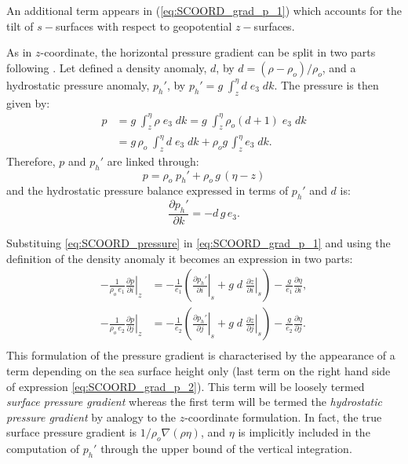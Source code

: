 \documentclass[../main/NEMO_manual]{subfiles}
\begin{document}
An additional term appears in (\autoref{eq:SCOORD_grad_p_1}) which accounts for
the tilt of $s-$surfaces with respect to geopotential $z-$surfaces.

As in $z$-coordinate,
the horizontal pressure gradient can be split in two parts following \citet{marsaleix.auclair.ea_OM08}.
Let defined a density anomaly, $d$, by $d=(\rho - \rho_o)/ \rho_o$,
and a hydrostatic pressure anomaly, $p_h'$, by $p_h'= g \; \int_z^\eta d \; e_3 \; dk$.
The pressure is then given by:
\[
  \begin{split}
    p &= g\; \int_z^\eta \rho \; e_3 \; dk = g\; \int_z^\eta \rho_o \left( d + 1 \right) \; e_3 \; dk   \\
    &= g \, \rho_o \; \int_z^\eta d \; e_3 \; dk + \rho_o g \, \int_z^\eta e_3 \; dk .
  \end{split}
\]
Therefore, $p$ and $p_h'$ are linked through:
\begin{equation}
  \label{eq:SCOORD_pressure}
  p = \rho_o \; p_h' + \rho_o \, g \, ( \eta - z )
\end{equation}
and the hydrostatic pressure balance expressed in terms of $p_h'$ and $d$ is:
\[
  \frac{\partial p_h'}{\partial k} = - d \, g \, e_3 .
\]

Substituing \autoref{eq:SCOORD_pressure} in \autoref{eq:SCOORD_grad_p_1} and
using the definition of the density anomaly it becomes an expression in two parts:
\begin{equation}
  \label{eq:SCOORD_grad_p_2}
  \begin{split}
    -\frac{1}{\rho_o \, e_1 } \left. {\frac{\partial p}{\partial i}} \right|_z
    &=-\frac{1}{e_1 } \left(     \left.              {\frac{\partial p_h'}{\partial i}} \right|_s
      + g\; d  \;\left. {\frac{\partial z}{\partial i}} \right|_s    \right)  - \frac{g}{e_1 } \frac{\partial \eta}{\partial i} ,  \\
    -\frac{1}{\rho_o \, e_2 }\left. {\frac{\partial p}{\partial j}} \right|_z
    &=-\frac{1}{e_2 } \left(    \left.               {\frac{\partial p_h'}{\partial j}} \right|_s
      + g\; d \;\left. {\frac{\partial z}{\partial j}} \right|_s   \right)  - \frac{g}{e_2 } \frac{\partial \eta}{\partial j} . \\
  \end{split}
\end{equation}
This formulation of the pressure gradient is characterised by the appearance of
a term depending on the sea surface height only
(last term on the right hand side of expression \autoref{eq:SCOORD_grad_p_2}).
This term will be loosely termed \textit{surface pressure gradient} whereas
the first term will be termed the \textit{hydrostatic pressure gradient} by analogy to
the $z$-coordinate formulation.
In fact, the true surface pressure gradient is $1/\rho_o \nabla (\rho \eta)$,
and $\eta$ is implicitly included in the computation of $p_h'$ through the upper bound of the vertical integration.
\end{document}
